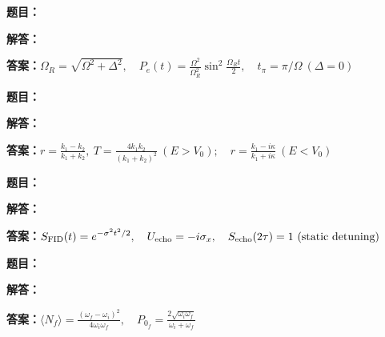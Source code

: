 \documentclass[lang=cn,color=blue,11pt]{elegantbook}
\begin{document}
\par
\noindent\textbf{题目：}
\par\noindent\textbf{解答：}
\par\noindent\textbf{答案：}\(\displaystyle \Omega_R=\sqrt{\Omega^2+\Delta^2},\quad P_e(t)=\frac{\Omega^2}{\Omega_R^2}\sin^2\frac{\Omega_Rt}{2},\quad t_{\pi}=\pi/\Omega\ (\Delta=0)\)\par
\par\smallskip\noindent\hrulefill\par\medskip
{}\par
\noindent\textbf{题目：}
\par\noindent\textbf{解答：}
\par\noindent\textbf{答案：}\(\displaystyle r=\frac{k_1-k_2}{k_1+k_2},\ T=\frac{4k_1k_2}{(k_1+k_2)^2}\ (E>V_0);\quad r=\frac{k_1-i\kappa}{k_1+i\kappa}\ (E<V_0)\)\par
\par\smallskip\noindent\hrulefill\par\medskip
{}\par
\noindent\textbf{题目：}
\par\noindent\textbf{解答：}
\par\noindent\textbf{答案：}\(\displaystyle S_{\rm FID}(t)=e^{-\sigma^2t^2/2},\quad U_{\rm echo}=-i\sigma_x,\quad S_{\rm echo}(2\tau)=1\text{ (static detuning)}\)\par
\par\smallskip\noindent\hrulefill\par\medskip
{}\par
\noindent\textbf{题目：}
\par\noindent\textbf{解答：}
\par\noindent\textbf{答案：}\(\displaystyle \langle N_f\rangle=\frac{(\omega_f-\omega_i)^2}{4\omega_i\omega_f},\quad P_{0_f}=\frac{2\sqrt{\omega_i\omega_f}}{\omega_i+\omega_f}\)\par
\end{document}
